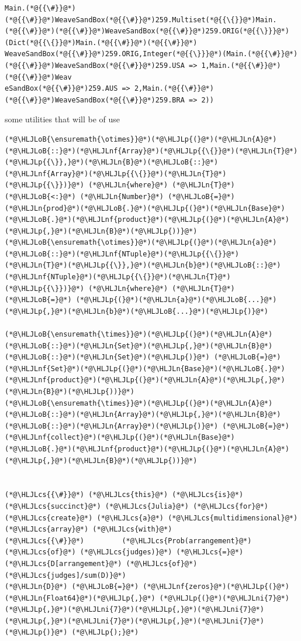 \documentclass[12pt,a4paper]{article}
\newcommand{\HLJLn}[1]{#1}
\newcommand{\HLJLnf}[1]{\textcolor[RGB]{66,102,213}{#1}}
\newcommand{\HLJLni}[1]{\textcolor[RGB]{59,151,46}{#1}}
\newcommand{\HLJLoB}[1]{\textcolor[RGB]{102,102,102}{\textbf{#1}}}
\newcommand{\HLJLp}[1]{#1}
\newcommand{\HLJLcs}[1]{\textcolor[RGB]{153,153,119}{\textit{#1}}}
\begin{document}
\begin{lstlisting}
Main.(*@{{\#}}@*)(*@{{\#}}@*)WeaveSandBox(*@{{\#}}@*)259.Multiset(*@{{\{}}@*)Main.(*@{{\#}}@*)(*@{{\#}}@*)WeaveSandBox(*@{{\#}}@*)259.ORIG(*@{{\}}}@*)(Dict(*@{{\{}}@*)Main.(*@{{\#}}@*)(*@{{\#}}@*)
WeaveSandBox(*@{{\#}}@*)259.ORIG,Integer(*@{{\}}}@*)(Main.(*@{{\#}}@*)(*@{{\#}}@*)WeaveSandBox(*@{{\#}}@*)259.USA => 1,Main.(*@{{\#}}@*)(*@{{\#}}@*)Weav
eSandBox(*@{{\#}}@*)259.AUS => 2,Main.(*@{{\#}}@*)(*@{{\#}}@*)WeaveSandBox(*@{{\#}}@*)259.BRA => 2))
\end{lstlisting}


some utilities that will be of use


\begin{lstlisting}
(*@\HLJLoB{\ensuremath{\otimes}}@*)(*@\HLJLp{(}@*)(*@\HLJLn{A}@*)(*@\HLJLoB{::}@*)(*@\HLJLnf{Array}@*)(*@\HLJLp{{\{}}@*)(*@\HLJLn{T}@*)(*@\HLJLp{{\}},}@*)(*@\HLJLn{B}@*)(*@\HLJLoB{::}@*)(*@\HLJLnf{Array}@*)(*@\HLJLp{{\{}}@*)(*@\HLJLn{T}@*)(*@\HLJLp{{\}})}@*) (*@\HLJLn{where}@*) (*@\HLJLn{T}@*)(*@\HLJLoB{<:}@*) (*@\HLJLn{Number}@*) (*@\HLJLoB{=}@*) (*@\HLJLn{prod}@*)(*@\HLJLoB{.}@*)(*@\HLJLp{(}@*)(*@\HLJLn{Base}@*)(*@\HLJLoB{.}@*)(*@\HLJLnf{product}@*)(*@\HLJLp{(}@*)(*@\HLJLn{A}@*)(*@\HLJLp{,}@*)(*@\HLJLn{B}@*)(*@\HLJLp{))}@*)
(*@\HLJLoB{\ensuremath{\otimes}}@*)(*@\HLJLp{(}@*)(*@\HLJLn{a}@*)(*@\HLJLoB{::}@*)(*@\HLJLnf{NTuple}@*)(*@\HLJLp{{\{}}@*)(*@\HLJLn{T}@*)(*@\HLJLp{{\}},}@*)(*@\HLJLn{b}@*)(*@\HLJLoB{::}@*)(*@\HLJLnf{NTuple}@*)(*@\HLJLp{{\{}}@*)(*@\HLJLn{T}@*)(*@\HLJLp{{\}})}@*) (*@\HLJLn{where}@*) (*@\HLJLn{T}@*)  (*@\HLJLoB{=}@*) (*@\HLJLp{(}@*)(*@\HLJLn{a}@*)(*@\HLJLoB{...}@*)(*@\HLJLp{,}@*)(*@\HLJLn{b}@*)(*@\HLJLoB{...}@*)(*@\HLJLp{)}@*)

(*@\HLJLoB{\ensuremath{\times}}@*)(*@\HLJLp{(}@*)(*@\HLJLn{A}@*)(*@\HLJLoB{::}@*)(*@\HLJLn{Set}@*)(*@\HLJLp{,}@*)(*@\HLJLn{B}@*)(*@\HLJLoB{::}@*)(*@\HLJLn{Set}@*)(*@\HLJLp{)}@*) (*@\HLJLoB{=}@*) (*@\HLJLnf{Set}@*)(*@\HLJLp{(}@*)(*@\HLJLn{Base}@*)(*@\HLJLoB{.}@*)(*@\HLJLnf{product}@*)(*@\HLJLp{(}@*)(*@\HLJLn{A}@*)(*@\HLJLp{,}@*)(*@\HLJLn{B}@*)(*@\HLJLp{))}@*)
(*@\HLJLoB{\ensuremath{\times}}@*)(*@\HLJLp{(}@*)(*@\HLJLn{A}@*)(*@\HLJLoB{::}@*)(*@\HLJLn{Array}@*)(*@\HLJLp{,}@*)(*@\HLJLn{B}@*)(*@\HLJLoB{::}@*)(*@\HLJLn{Array}@*)(*@\HLJLp{)}@*) (*@\HLJLoB{=}@*) (*@\HLJLnf{collect}@*)(*@\HLJLp{(}@*)(*@\HLJLn{Base}@*)(*@\HLJLoB{.}@*)(*@\HLJLnf{product}@*)(*@\HLJLp{(}@*)(*@\HLJLn{A}@*)(*@\HLJLp{,}@*)(*@\HLJLn{B}@*)(*@\HLJLp{))}@*)


(*@\HLJLcs{{\#}}@*) (*@\HLJLcs{this}@*) (*@\HLJLcs{is}@*) (*@\HLJLcs{succinct}@*) (*@\HLJLcs{Julia}@*) (*@\HLJLcs{for}@*) (*@\HLJLcs{create}@*) (*@\HLJLcs{a}@*) (*@\HLJLcs{multidimensional}@*) (*@\HLJLcs{array}@*) (*@\HLJLcs{with}@*) 
(*@\HLJLcs{{\#}}@*) 		(*@\HLJLcs{Prob(arrangement}@*) (*@\HLJLcs{of}@*) (*@\HLJLcs{judges)}@*) (*@\HLJLcs{=}@*) (*@\HLJLcs{D[arrangement}@*) (*@\HLJLcs{of}@*) (*@\HLJLcs{judges]/sum(D)}@*)
(*@\HLJLn{D}@*) (*@\HLJLoB{=}@*) (*@\HLJLnf{zeros}@*)(*@\HLJLp{(}@*)(*@\HLJLn{Float64}@*)(*@\HLJLp{,}@*) (*@\HLJLp{(}@*)(*@\HLJLni{7}@*)(*@\HLJLp{,}@*)(*@\HLJLni{7}@*)(*@\HLJLp{,}@*)(*@\HLJLni{7}@*)(*@\HLJLp{,}@*)(*@\HLJLni{7}@*)(*@\HLJLp{,}@*)(*@\HLJLni{7}@*)(*@\HLJLp{)}@*) (*@\HLJLp{);}@*)


\end{lstlisting}
\end{document}
